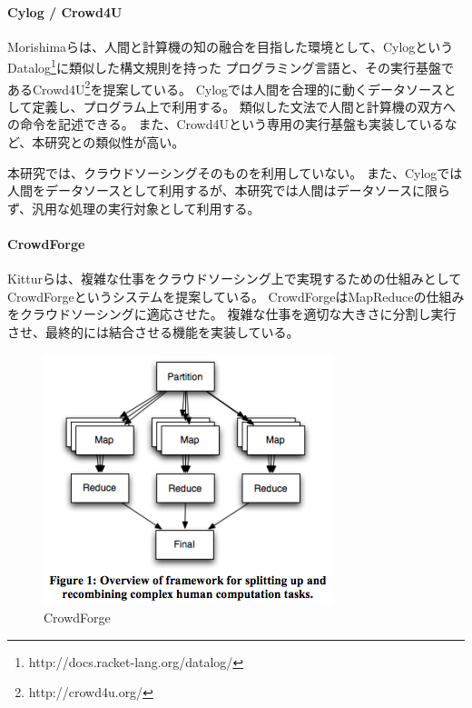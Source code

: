 \paragraph{Cylog / Crowd4U}\label{cylog-crowd4u}

\mbox{}

Morishimaらは、人間と計算機の知の融合を目指した環境として、Cylog\cite{cylog}というDatalog\footnote{http://docs.racket-lang.org/datalog/}に類似した構文規則を持った
プログラミング言語と、その実行基盤であるCrowd4U\footnote{http://crowd4u.org/}を提案している。
Cylogでは人間を合理的に動くデータソースとして定義し、プログラム上で利用する。
類似した文法で人間と計算機の双方への命令を記述できる。
また、Crowd4Uという専用の実行基盤も実装しているなど、本研究との類似性が高い。

本研究では、クラウドソーシングそのものを利用していない。
また、Cylogでは人間をデータソースとして利用するが、本研究では人間はデータソースに限らず、汎用な処理の実行対象として利用する。

\paragraph{CrowdForge}\label{crowdforge}

\mbox{}

Kitturら\cite{crowdforge}は、複雑な仕事をクラウドソーシング上で実現するための仕組みとして
CrowdForgeというシステムを提案している。
CrowdForgeはMapReduceの仕組みをクラウドソーシングに適応させた。
複雑な仕事を適切な大きさに分割し実行させ、最終的には結合させる機能を実装している。

\begin{figure}[htbp]
  \begin{center}
  \includegraphics[width=.6\linewidth,bb=0 0 318 276]{images/crowdforge.png}
  \end{center}
  \caption{CrowdForge}
  \label{fig:crowdforge}
\end{figure}

